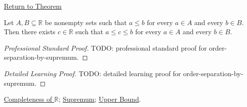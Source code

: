 \newpage
{}
\label{prf:order-separation-by-supremum}

\begin{remark*}[Return]
\hyperref[thm:order-separation-by-supremum]{Return to Theorem}
\end{remark*}

\begin{theorem*}
Let $A,B\subseteq\mathbb{R}$ be nonempty sets such that $a\le b$ for every
$a\in A$ and every $b\in B$. Then there exists $c\in\mathbb{R}$ such that
$a\le c\le b$ for every $a\in A$ and every $b\in B$.
\end{theorem*}

\begin{proof}[Professional Standard Proof]
\LRAProofBodyStart
TODO: professional standard proof for order-separation-by-supremum.
\end{proof}

\begin{proof}[Detailed Learning Proof]
\LRAProofBodyStart
TODO: detailed learning proof for order-separation-by-supremum.
\end{proof}

\begin{remark*}
\end{remark*}

\begin{dependencies}
\hyperref[ax:completeness-of-reals]{Completeness of $\mathbb{R}$};
\hyperref[def:supremum]{Supremum};
\hyperref[def:real-upper-bound]{Upper Bound}.
\end{dependencies}

\clearpage

